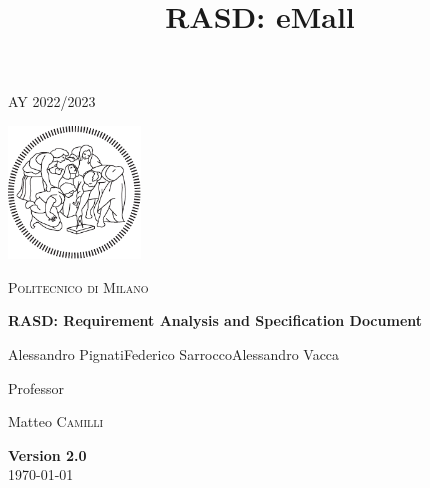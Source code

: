 \documentclass{article}
\title{\textbf{RASD: eMall}}
\begin{document}
\begin{titlepage}
    \centering
    {\scshape\large AY 2022/2023 \par}
    \vfill
    \includegraphics[width=100pt]{img/logo-polimi-new}\par\vspace{1cm}
    {\scshape\LARGE Politecnico di Milano \par}
    \vspace{1.5cm}
    {\huge\bfseries RASD\@: Requirement Analysis
        and Specification Document \par}
    \vspace{2cm}
    {\large {Alessandro Pignati\quad Federico Sarrocco\quad Alessandro Vacca}\par}
    \vfill
    {\large Professor\par
        Matteo \textsc{Camilli}}
    \vfill
    {\large \textbf{Version 2.0}\\ \today \par}
\end{titlepage}
\clearpage
\tableofcontents
{}
\clearpage
{}





\end{document}

